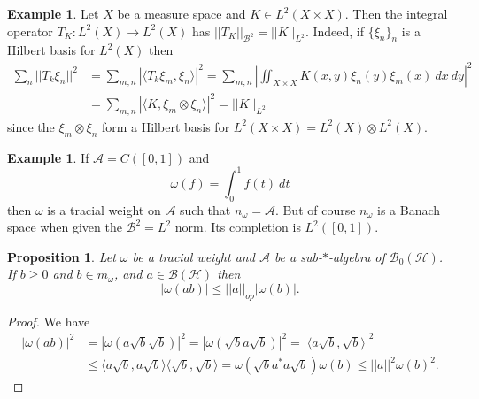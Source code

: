 \documentclass[12pt]{report}
\newcommand{\AAA}{\mathcal A}
\newcommand{\BB}{\mathcal B}
\newcommand{\HH}{\mathcal H}
\newtheorem{proposition}[theorem]{Proposition}
\theoremstyle{definition}
\newtheorem{example}[theorem]{Example}
\begin{document}
\begin{example}
    Let $X$ be a measure space and $K \in L^2(X \times X)$. Then the integral operator $T_K: L^2(X) \to L^2(X)$ has $||T_K||_{\BB^2} = ||K||_{L^2}$. Indeed, if $\{\xi_n\}_n$ is a Hilbert basis for $L^2(X)$ then
\begin{align*}
    \sum_n ||T_k\xi_n||^2
        &= \sum_{m,n} |\langle T_k\xi_m, \xi_n\rangle|^2
        = \sum_{m,n} \left|\iint_{X \times X} K(x, y) \xi_n(y) \xi_m(x) ~dx ~dy\right|^2\\
        &= \sum_{m,n} |\langle K, \xi_m \otimes \xi_n\rangle|^2
        = ||K||_{L^2}
\end{align*}
    since the $\xi_m \otimes \xi_n$ form a Hilbert basis for $L^2(X \times X) = L^2(X) \otimes L^2(X)$.
\end{example}
\begin{example}
    If $\AAA = C([0, 1])$ and
    $$\omega(f) = \int_0^1 f(t) ~dt$$
    then $\omega$ is a tracial weight on $\AAA$ such that $n_\omega = \AAA$. But of course $n_\omega$ is a Banach space when given the $\BB^2 = L^2$ norm. Its completion is $L^2([0, 1])$.
\end{example}
\begin{proposition}
    Let $\omega$ be a tracial weight and $\AAA$ be a sub-$*$-algebra of $\BB_0(\HH)$. If $b \geq 0$ and $b \in m_\omega$, and $a \in \BB(\HH)$ then
    $$|\omega(ab)| \leq ||a||_{op}|\omega(b)|.$$
\end{proposition}
\begin{proof}
    We have
\begin{align*}
    |\omega(ab)|^2
        &= |\omega(a \sqrt b \sqrt b)|^2
        = |\omega(\sqrt b a \sqrt b)|^2
        = |\langle a \sqrt b, \sqrt b\rangle|^2\\
        &\leq \langle a\sqrt b, a\sqrt b\rangle \langle \sqrt b, \sqrt b\rangle
        = \omega(\sqrt b a^* a\sqrt b)\omega(b)
        \leq ||a||^2 \omega(b)^2.
\end{align*}
\end{proof}
\end{document}
